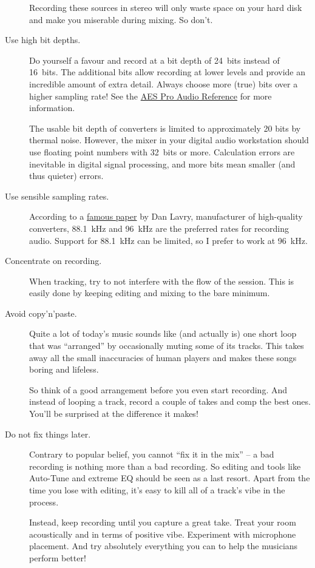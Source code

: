 \begin{description}
  Recording these sources in stereo will only waste space on your hard
  disk and make you miserable during mixing.  So don't.

\item[Use high bit depths.]  Do yourself a favour and record at a bit
  depth of \SI{24}{bits} instead of \SI{16}{bits}.  The additional
  bits allow recording at lower levels and provide an incredible
  amount of extra detail.  Always choose more (true) bits over a
  higher sampling rate!  See the
  \href{http://www.aes.org/par/d/\#data_converter_bits}{AES Pro Audio
    Reference} for more information.

  The usable bit depth of converters is limited to approximately 20
  bits by thermal noise.  However, the mixer in your digital audio
  workstation should use floating point numbers with \SI{32}{bits} or
  more.  Calculation errors are inevitable in digital signal
  processing, and more bits mean smaller (and thus quieter) errors.

\item[Use sensible sampling rates.]  According to a
  \href{http://www.lavryengineering.com/pdfs/lavry-white-paper-the_optimal_sample_rate_for_quality_audio.pdf}{famous
    paper} by Dan Lavry, manufacturer of high-quality converters,
  \SI{88.1}{\kilo\hertz} and \SI{96}{\kilo\hertz} are the preferred
  rates for recording audio.  Support for \SI{88.1}{\kilo\hertz} can
  be limited, so I prefer to work at \SI{96}{\kilo\hertz}.

\item[Concentrate on recording.]  When tracking, try to not interfere
  with the flow of the session.  This is easily done by keeping
  editing and mixing to the bare minimum.

\item[Avoid copy'n'paste.]  Quite a lot of today's music sounds like
  (and actually is) one short loop that was ``arranged'' by
  occasionally muting some of its tracks.  This takes away all the
  small inaccuracies of human players and makes these songs boring and
  lifeless.

  So think of a good arrangement before you even start recording.  And
  instead of looping a track, record a couple of takes and comp the
  best ones.  You'll be surprised at the difference it makes!

\item[Do not fix things later.]  Contrary to popular belief, you
  cannot ``fix it in the mix'' -- a bad recording is nothing more than
  a bad recording.  So editing and tools like Auto-Tune and extreme EQ
  should be seen as a last resort.  Apart from the time you lose with
  editing, it's easy to kill all of a track's vibe in the process.

  Instead, keep recording until you capture a great take.  Treat your
  room acoustically and in terms of positive vibe.  Experiment with
  microphone placement.  And try absolutely everything you can to help
  the musicians perform better!

\end{description}


